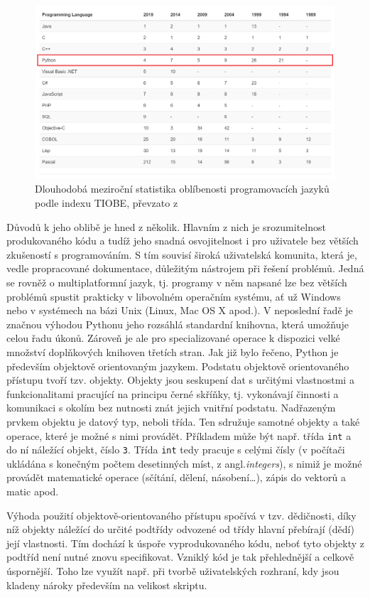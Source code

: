 \documentclass[a4paper, 12pt]{article}
\begin{document}
\begin{figure}[ht!]
    \centering
    \includegraphics[width=\linewidth]{tiobe.png}
    \caption{Dlouhodobá meziroční statistika oblíbenosti programovacích jazyků podle indexu TIOBE, převzato z \cite{tiobe}}
    \label{fig:tiobe}
\end{figure}

Důvodů k jeho oblibě je hned z několik. Hlavním z nich je srozumitelnost produkovaného kódu a tudíž jeho snadná osvojitelnost i pro uživatele bez větších zkušeností s programováním. S tím souvisí široká uživatelská komunita, která je, vedle propracované dokumentace, důležitým nástrojem při řešení problémů. Jedná se rovněž o multiplatformní jazyk, tj. programy v něm napsané lze bez větších problémů spustit prakticky v libovolném operačním systému, ať už Windows nebo v systémech na bázi Unix (Linux, Mac OS X apod.). V neposlední řadě je značnou výhodou Pythonu jeho rozsáhlá standardní knihovna, která umožňuje celou řadu úkonů. Zároveň je ale pro specializované operace k dispozici velké množství doplňkových knihoven třetích stran.
\vskip 0.1in
\noindent Jak již bylo řečeno, Python je především objektově orientovaným jazykem. Podstatu objektově orientovaného přístupu tvoří tzv. objekty. Objekty jsou seskupení dat s určitými vlastnostmi a funkcionalitami pracující na principu černé skříňky, tj. vykonávají činnosti a komunikaci s okolím bez nutnosti znát jejich vnitřní podstatu. Nadřazeným prvkem objektu je datový typ, neboli třída. Ten sdružuje samotné objekty a také operace, které je možné s nimi provádět. Příkladem může být např. třída \texttt{int} a do ní náležící objekt, číslo \texttt{3}. Třída \texttt{int} tedy pracuje s celými čísly (v počítači ukládána s konečným počtem desetinných míst, z angl.\textit{integers}), s nimiž je možné provádět matematické operace (sčítání, dělení, násobení\ldots), zápis do vektorů a matic apod. \par
Výhoda použití objektově-orientovaného přístupu spočívá v tzv. dědičnosti, díky níž objekty náležící do určité podtřídy odvozené od třídy hlavní přebírají (dědí) její vlastnosti. Tím dochází k úspoře vyprodukovaného kódu, neboť tyto objekty z podtříd není nutné znovu specifikovat. Vzniklý kód je tak přehlednější a celkově úspornější. Toho lze využít např. při tvorbě uživatelských rozhraní, kdy jsou kladeny nároky především na velikost skriptu.
\end{document}

